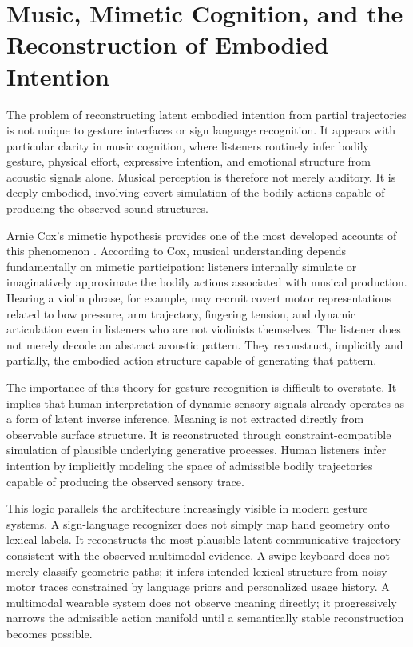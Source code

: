 \documentclass[11pt, a4paper]{article}
\theoremstyle{definition}
\begin{document}
\section{Music, Mimetic Cognition, and the Reconstruction of Embodied Intention}

The problem of reconstructing latent embodied intention from partial trajectories is not unique to gesture interfaces or sign language recognition. It appears with particular clarity in music cognition, where listeners routinely infer bodily gesture, physical effort, expressive intention, and emotional structure from acoustic signals alone. Musical perception is therefore not merely auditory. It is deeply embodied, involving covert simulation of the bodily actions capable of producing the observed sound structures.

Arnie Cox's mimetic hypothesis provides one of the most developed accounts of this phenomenon \cite{cox2016}. According to Cox, musical understanding depends fundamentally on mimetic participation: listeners internally simulate or imaginatively approximate the bodily actions associated with musical production. Hearing a violin phrase, for example, may recruit covert motor representations related to bow pressure, arm trajectory, fingering tension, and dynamic articulation even in listeners who are not violinists themselves. The listener does not merely decode an abstract acoustic pattern. They reconstruct, implicitly and partially, the embodied action structure capable of generating that pattern.

The importance of this theory for gesture recognition is difficult to overstate. It implies that human interpretation of dynamic sensory signals already operates as a form of latent inverse inference. Meaning is not extracted directly from observable surface structure. It is reconstructed through constraint-compatible simulation of plausible underlying generative processes. Human listeners infer intention by implicitly modeling the space of admissible bodily trajectories capable of producing the observed sensory trace.

This logic parallels the architecture increasingly visible in modern gesture systems. A sign-language recognizer does not simply map hand geometry onto lexical labels. It reconstructs the most plausible latent communicative trajectory consistent with the observed multimodal evidence. A swipe keyboard does not merely classify geometric paths; it infers intended lexical structure from noisy motor traces constrained by language priors and personalized usage history. A multimodal wearable system does not observe meaning directly; it progressively narrows the admissible action manifold until a semantically stable reconstruction becomes possible.
\end{document}
